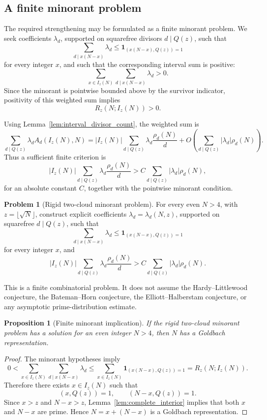 \documentclass[11pt]{article}
\theoremstyle{plain}
\newtheorem{proposition}[theorem]{Proposition}
\theoremstyle{definition}
\newtheorem{problem}[theorem]{Problem}
\theoremstyle{remark}
\newcommand{\one}{\mathbf 1}
\begin{document}
\subsection{A finite minorant problem}

The required strengthening may be formulated as a finite minorant problem.  We
seek coefficients \(\lambda_d\), supported on squarefree divisors \(d\mid Q(z)\),
such that
\[
\sum_{d\mid x(N-x)}\lambda_d
\le
\one_{(x(N-x),Q(z))=1}
\]
for every integer \(x\), and such that the corresponding interval sum is
positive:
\[
\sum_{x\in I_z(N)}\sum_{d\mid x(N-x)}\lambda_d>0.
\]
Since the minorant is pointwise bounded above by the survivor indicator,
positivity of this weighted sum implies
\[
R_z(N;I_z(N))>0.
\]

Using Lemma~\ref{lem:interval_divisor_count}, the weighted sum is
\[
\sum_{d\mid Q(z)}\lambda_d A_d(I_z(N),N)
=
|I_z(N)|\sum_{d\mid Q(z)}\lambda_d\frac{\rho_d(N)}d
+O\left(\sum_{d\mid Q(z)}|\lambda_d|\rho_d(N)\right).
\]
Thus a sufficient finite criterion is
\[
|I_z(N)|\sum_{d\mid Q(z)}\lambda_d\frac{\rho_d(N)}d
>
C\sum_{d\mid Q(z)}|\lambda_d|\rho_d(N),
\]
for an absolute constant \(C\), together with the pointwise minorant condition.

\begin{problem}[Rigid two-cloud minorant problem]
\label{prob:rigid_minorant}
For every even \(N>4\), with \(z=\lfloor\sqrt N\rfloor\), construct explicit
coefficients \(\lambda_d=\lambda_d(N,z)\), supported on squarefree \(d\mid Q(z)\),
such that
\[
\sum_{d\mid x(N-x)}\lambda_d
\le
\one_{(x(N-x),Q(z))=1}
\]
for every integer \(x\), and
\[
|I_z(N)|\sum_{d\mid Q(z)}\lambda_d\frac{\rho_d(N)}d
>
C\sum_{d\mid Q(z)}|\lambda_d|\rho_d(N).
\]
\end{problem}

This is a finite combinatorial problem.  It does not assume the
Hardy--Littlewood conjecture, the Bateman--Horn conjecture, the
Elliott--Halberstam conjecture, or any asymptotic prime-distribution estimate.

\begin{proposition}[Finite minorant implication]
\label{prop:minorant_implication}
If the rigid two-cloud minorant problem has a solution for an even integer
\(N>4\), then \(N\) has a Goldbach representation.
\end{proposition}

\begin{proof}
The minorant hypotheses imply
\[
0<\sum_{x\in I_z(N)}\sum_{d\mid x(N-x)}\lambda_d
\le
\sum_{x\in I_z(N)}\one_{(x(N-x),Q(z))=1}
=R_z(N;I_z(N)).
\]
Therefore there exists \(x\in I_z(N)\) such that
\[
(x,Q(z))=1,
\qquad
(N-x,Q(z))=1.
\]
Since \(x>z\) and \(N-x>z\), Lemma~\ref{lem:complete_interior} implies that
both \(x\) and \(N-x\) are prime.  Hence \(N=x+(N-x)\) is a Goldbach
representation.
\end{proof}
\end{document}
